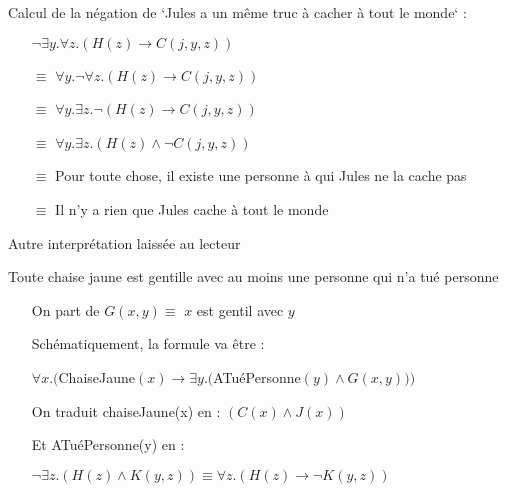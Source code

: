 \begin{frame}

Calcul de la négation de `Jules a un même truc à cacher à tout le monde` :\pause

\begin{itemize}
\item[] $\neg \exists y. \forall z. (H(z) \rightarrow C(j,y,z))$\pause
\item[$\equiv$] $\forall y. \neg  \forall z. (H(z) \rightarrow C(j,y,z))$\pause
\item[$\equiv$] $\forall y. \exists z. \neg (H(z) \rightarrow C(j,y,z))$\pause
\item[$\equiv$] $\forall y. \exists z. (H(z) \wedge \neg C(j,y,z))$\pause
\item[$\equiv$] Pour toute chose, il existe une personne à qui Jules ne la cache pas\pause
\item[$\equiv$] Il n'y a rien que Jules cache à tout le monde\pause
\end{itemize}

Autre interprétation laissée au lecteur

\end{frame}


\begin{frame}

Toute chaise jaune est gentille avec au moins une personne qui n'a tué personne\pause

\begin{itemize}
\item[] On part de $G(x,y) \equiv $ $x$ est gentil avec $y$\pause
\end{itemize}
\vspace{1mm}
\begin{itemize}
\item[] Schématiquement, la formule va être : 
\item[] $\forall x. ($ChaiseJaune$(x) \rightarrow \exists y. ($ATuéPersonne$(y) \wedge G(x,y)))$\pause
\end{itemize}
\vspace{1mm}
\begin{itemize}
\item[] On traduit chaiseJaune(x) en : \pause $(C(x) \wedge J(x))$\pause
\end{itemize}
\vspace{1mm}
\begin{itemize}
\item[] Et ATuéPersonne(y) en :\pause 
\item[] $\neg \exists z. (H(z) \wedge K(y,z))$\pause $\equiv \forall z. (H(z) \rightarrow \neg K(y,z))$
\end{itemize}
\end{frame}


